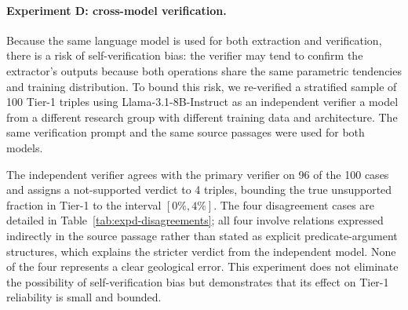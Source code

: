 \documentclass[10pt]{article}
\begin{document}
\paragraph{Experiment D: cross-model verification.}

Because the same language model is used for both extraction
and verification, there is a risk of self-verification
bias: the verifier may tend to confirm the extractor's
outputs because both operations share the same parametric
tendencies and training distribution.
To bound this risk, we re-verified a stratified sample of
100 Tier-1 triples using Llama-3.1-8B-Instruct
\citep{touvron2023llama} as an independent verifier a
model from a different research group with different
training data and architecture.
The same verification prompt and the same source passages
were used for both models.

The independent verifier agrees with the primary verifier
on 96 of the 100 cases and assigns a not-supported verdict
to 4 triples, bounding the true unsupported fraction in
Tier-1 to the interval $[0\%, 4\%]$.
The four disagreement cases are detailed in
Table~\ref{tab:expd-disagreements}; all four involve
relations expressed indirectly in the source passage rather
than stated as explicit predicate-argument structures,
which explains the stricter verdict from the independent
model.
None of the four represents a clear geological error.
This experiment does not eliminate the possibility of
self-verification bias but demonstrates that its effect
on Tier-1 reliability is small and bounded.
\end{document}
